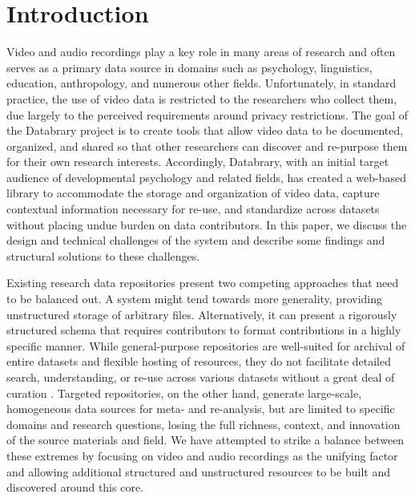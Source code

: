 \documentclass{sig-alternate}
\begin{document}


\section{Introduction}


Video and audio recordings play a key role in many areas of research and often serves as a primary data source in domains such as psychology, linguistics, education, anthropology, and numerous other fields.
Unfortunately, in standard practice, the use of video data is restricted to the researchers who collect them, due largely to the perceived requirements around privacy restrictions.
The goal of the Databrary project is to create tools that allow video data to be documented, organized, and shared so that other researchers can discover and re-purpose them for their own research interests.
Accordingly, Databrary, with an initial target audience of developmental psychology and related fields, has created a web-based library to accommodate the storage and organization of video data, capture contextual information necessary for re-use, and standardize across datasets without placing undue burden on data contributors.
In this paper, we discuss the design and technical challenges of the system and describe some findings and structural solutions to these challenges.

Existing research data repositories present two competing approaches that need to be balanced out.
A system might tend towards more generality, providing unstructured storage of arbitrary files.
Alternatively, it can present a rigorously structured schema that requires contributors to format contributions in a highly specific manner.
While general-purpose repositories are well-suited for archival of entire datasets and flexible hosting of resources, they do not facilitate detailed search, understanding, or re-use across various datasets without a great deal of curation \cite{Peer_2012}.
Targeted repositories, on the other hand, generate large-scale, homogeneous data sources for meta- and re-analysis, but are limited to specific domains and research questions, losing the full richness, context, and innovation of the source materials and field.
We have attempted to strike a balance between these extremes by focusing on video and audio recordings as the unifying factor and allowing additional structured and unstructured resources to be built and discovered around this core.
\end{document}
